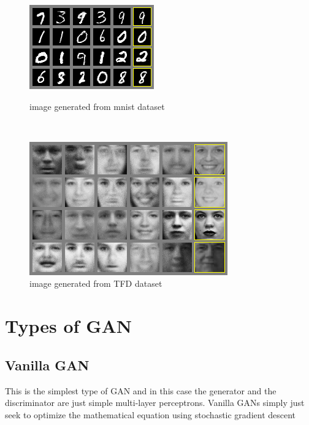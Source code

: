 \documentclass[12pt]{article}
\begin{document}
\begin{figure}
\centering
\begin{minipage}{.45\textwidth}
\includegraphics[width=\textwidth]{mnist1.png}
\caption{image generated from mnist dataset}
\end{minipage}
~~~~
\begin{minipage}{.45\textwidth}
\includegraphics[width=\textwidth]{tfd1.png}
\caption{image generated from TFD dataset}
\end{minipage}
\end{figure}


\section{Types of GAN}
\subsection{Vanilla GAN}
This is the simplest type of GAN\cite{GAN} and in this case the generator and the discriminator are just simple multi-layer perceptrons. Vanilla GANs simply just seek to optimize the mathematical equation using stochastic gradient descent
\end{document}
